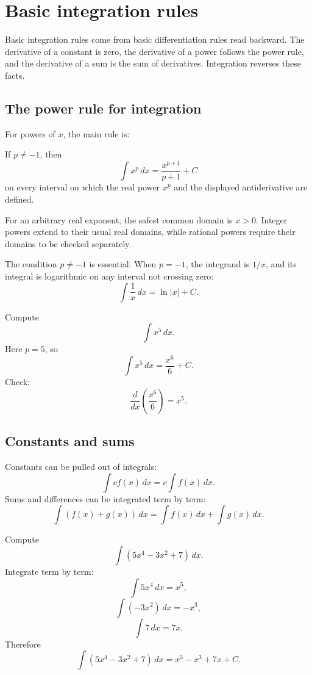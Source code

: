 \section{Basic integration rules}

Basic integration rules come from basic differentiation rules read backward. The derivative of a constant is zero, the derivative of a power follows the power rule, and the derivative of a sum is the sum of derivatives. Integration reverses these facts.

\subsection*{The power rule for integration}

For powers of \(x\), the main rule is:

\begin{theorembox}
If \(p\ne -1\), then
\[
\int x^p\,dx=\frac{x^{p+1}}{p+1}+C
\]
on every interval on which the real power \(x^p\) and the displayed antiderivative are defined.
\end{theorembox}

For an arbitrary real exponent, the safest common domain is \(x>0\). Integer powers extend to their usual real domains, while rational powers require their domains to be checked separately.

The condition \(p\ne -1\) is essential. When \(p=-1\), the integrand is \(1/x\), and its integral is logarithmic on any interval not crossing zero:
\[
\int \frac1x\,dx=\ln|x|+C.
\]

\begin{examplebox}
Compute
\[
\int x^5\,dx.
\]
Here \(p=5\), so
\[
\int x^5\,dx=\frac{x^6}{6}+C.
\]
Check:
\[
\frac{d}{dx}\left(\frac{x^6}{6}\right)=x^5.
\]
\end{examplebox}

\subsection*{Constants and sums}

Constants can be pulled out of integrals:
\[
\int c f(x)\,dx=c\int f(x)\,dx.
\]
Sums and differences can be integrated term by term:
\[
\int (f(x)+g(x))\,dx=\int f(x)\,dx+\int g(x)\,dx.
\]

\begin{examplebox}
Compute
\[
\int (5x^4-3x^2+7)\,dx.
\]
Integrate term by term:
\[
\int 5x^4\,dx=x^5,
\]
\[
\int (-3x^2)\,dx=-x^3,
\]
\[
\int 7\,dx=7x.
\]
Therefore
\[
\int (5x^4-3x^2+7)\,dx=x^5-x^3+7x+C.
\]
\end{examplebox}

